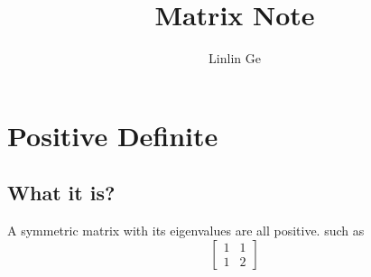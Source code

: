 \documentclass[10pt]{article}
\title{Matrix Note}
\author{Linlin Ge}
\begin{document}
\maketitle
\section{Positive Definite}
\subsection{What it is?}
A symmetric matrix with its eigenvalues are all positive. such as
\[
	\begin{bmatrix}
		1 & 1 \\
		1 & 2
	\end{bmatrix}
\]
\end{document}
